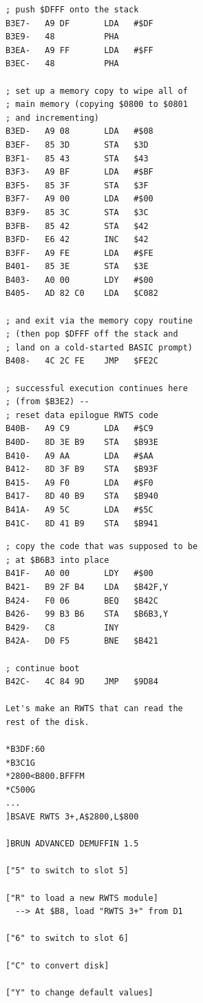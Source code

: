 \documentclass{article}
\begin{document}
\begin{verbatim}
; push $DFFF onto the stack
B3E7-   A9 DF       LDA   #$DF
B3E9-   48          PHA
B3EA-   A9 FF       LDA   #$FF
B3EC-   48          PHA

; set up a memory copy to wipe all of
; main memory (copying $0800 to $0801
; and incrementing)
B3ED-   A9 08       LDA   #$08
B3EF-   85 3D       STA   $3D
B3F1-   85 43       STA   $43
B3F3-   A9 BF       LDA   #$BF
B3F5-   85 3F       STA   $3F
B3F7-   A9 00       LDA   #$00
B3F9-   85 3C       STA   $3C
B3FB-   85 42       STA   $42
B3FD-   E6 42       INC   $42
B3FF-   A9 FE       LDA   #$FE
B401-   85 3E       STA   $3E
B403-   A0 00       LDY   #$00
B405-   AD 82 C0    LDA   $C082

; and exit via the memory copy routine
; (then pop $DFFF off the stack and
; land on a cold-started BASIC prompt)
B408-   4C 2C FE    JMP   $FE2C

; successful execution continues here
; (from $B3E2) --
; reset data epilogue RWTS code
B40B-   A9 C9       LDA   #$C9
B40D-   8D 3E B9    STA   $B93E
B410-   A9 AA       LDA   #$AA
B412-   8D 3F B9    STA   $B93F
B415-   A9 F0       LDA   #$F0
B417-   8D 40 B9    STA   $B940
B41A-   A9 5C       LDA   #$5C
B41C-   8D 41 B9    STA   $B941
\end{verbatim}

\newpage

\begin{verbatim}
; copy the code that was supposed to be
; at $B6B3 into place
B41F-   A0 00       LDY   #$00
B421-   B9 2F B4    LDA   $B42F,Y
B424-   F0 06       BEQ   $B42C
B426-   99 B3 B6    STA   $B6B3,Y
B429-   C8          INY
B42A-   D0 F5       BNE   $B421

; continue boot
B42C-   4C 84 9D    JMP   $9D84

Let's make an RWTS that can read the
rest of the disk.

*B3DF:60
*B3C1G
*2800<B800.BFFFM
*C500G
...
]BSAVE RWTS 3+,A$2800,L$800

]BRUN ADVANCED DEMUFFIN 1.5

["5" to switch to slot 5]

["R" to load a new RWTS module]
  --> At $B8, load "RWTS 3+" from D1

["6" to switch to slot 6]

["C" to convert disk]

["Y" to change default values]
\end{verbatim}

\newpage
\end{document}
